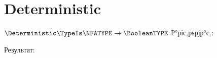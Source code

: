\section{Deterministic}
\begin{frame}{$\Deterministic\TypeIs\NFATYPE\to\BooleanTYPE$}
	Р°ріс‚рѕрјр°с‚:

	Результат:
\end{frame}